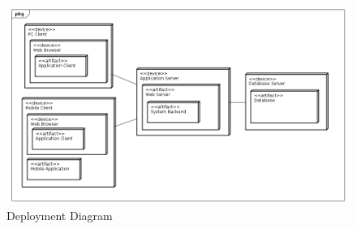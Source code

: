 \begin{figure}[h]
\centering\includegraphics[width=\textwidth]{Images/UMLDiagrams/DeploymentDiagram.png}
\caption{Deployment Diagram}
\end{figure}

\clearpage